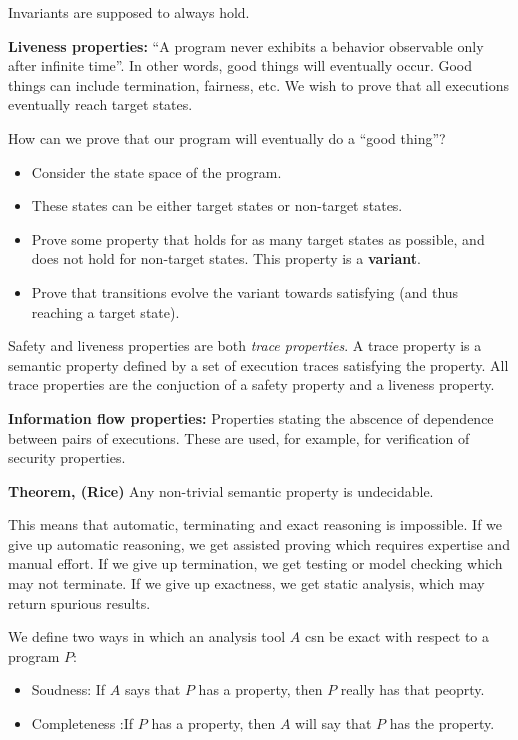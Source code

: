 Invariants are supposed to always hold.

\textbf{Liveness properties:} ``A program never exhibits a behavior observable only after infinite time''.
In other words, good things will eventually occur. Good things can include termination,
fairness, etc. We wish to prove that all executions eventually reach target
states.

How can we prove that our program will eventually do a ``good thing''?
\begin{itemize}
\item Consider the state space of the program.
\item These states can be either target states or non-target states.
\item Prove some property that holds for as many target states as possible,
and does not hold for non-target states. This property is a \textbf{variant}.
\item Prove that transitions evolve the variant towards satisfying (and thus
reaching a target state).
\end{itemize}

Safety and liveness properties are both \emph{trace properties}.
A trace property is a semantic property defined by a set
of execution traces satisfying the property. All trace properties
are the conjuction of a safety property and a liveness property.

\textbf{Information flow properties:} Properties stating the abscence of dependence
between pairs of executions. These are used, for example, for verification
of security properties.

\textbf{Theorem, (Rice)} Any non-trivial semantic property is undecidable.

This means that automatic, terminating and exact reasoning
is impossible. If we give up automatic reasoning, we
get assisted proving which requires expertise and manual effort.
If we give up termination, we get testing or model checking which may
not terminate. If we give up exactness, we get static analysis,
which may return spurious results.

We define two ways in which an analysis tool $A$ csn be exact 
with respect to a program $P$:
\begin{itemize}
\item Soudness: If $A$ says that $P$ has a property, then $P$ really has that peoprty.
\item Completeness :If $P$ has a property, then $A$ will say that $P$ has
the property.
\end{itemize}


